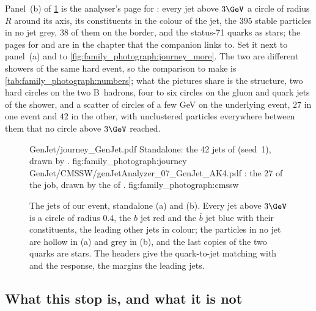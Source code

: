 Panel~(b) of \cref{fig:family_photograph:displays} is the analyser's page
for \akfour: every jet above $3\GeV$ a circle of radius $R$ around its
axis, its constituents in the colour of the jet, the $395$ stable
particles in no jet grey, $38$ of them on the border, and the status-71
quarks as stars; the pages for \akfournonu and \akeight are in the
 chapter that the companion links to. Set it next to
panel~(a) and to \cref{fig:family_photograph:journey_more}. The two are
different showers of the same hard event, so the comparison to make is
\cref{tab:family_photograph:numbers}; what the pictures share is the
structure, two hard circles on the two B~hadrons, four to six circles on
the gluon and quark jets of the shower, and a scatter of circles of a few
GeV on the underlying event, $27$ in one event and $42$ in the other,
with unclustered particles everywhere between them that no circle above
$3\GeV$ reached.

\begin{figure}[p]\centering
\ledgerdisplays
  {GenJet/journey_GenJet.pdf}
  {Standalone: the 42 \akfour jets of  (seed~1), drawn by .}
  {fig:family_photograph:journey}
  {GenJet/CMSSW/genJetAnalyzer_07_GenJet_AK4.pdf}
  {\CMSSW: the 27  of the  job, drawn by the  of .}
  {fig:family_photograph:cmssw}
\caption[The \akfour jets of the event in the $(\eta,\phi)$ plane,
standalone and \CMSSW]{The \akfour jets of our event, standalone (a) and
\CMSSW (b). Every jet above $3\GeV$ is a circle of radius $0.4$, the $b$
jet red and the $\bar b$ jet blue with their constituents, the leading
other jets in colour; the particles in no jet are hollow in (a) and grey
in (b), and the last copies of the two quarks are stars. The headers give
the quark-to-jet matching with \dR and the response, the margins the
leading jets.}
\label{fig:family_photograph:displays}
\end{figure}

\subsection{What this stop is, and what it is not}
\label{sec:family_photograph:caveats}

